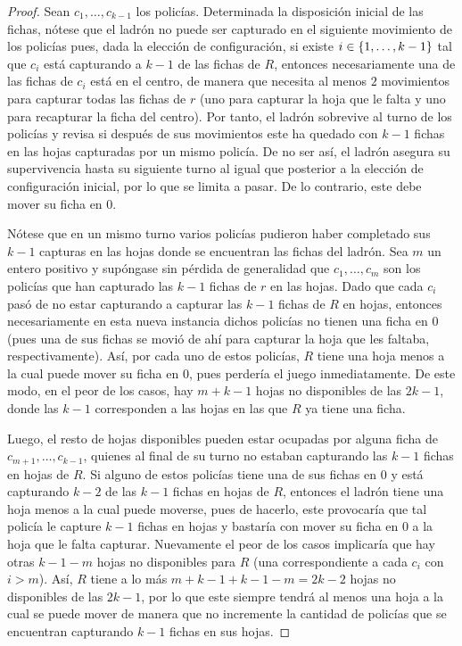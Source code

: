 \begin{proof}
    Sean $c_1,\dots, c_{k-1}$ los polic\'ias. Determinada la disposici\'on
    inicial de las fichas, n\'otese que el ladr\'on no puede ser capturado en el
    siguiente movimiento de los polic\'ias pues, dada la elecci\'on de
    configuraci\'on, si existe $i\in\{1,\dots, k-1\}$ tal que $c_i$ est\'a
    capturando a $k-1$ de las fichas de $R$, entonces necesariamente una de las
    fichas de $c_i$ est\'a en el centro, de manera que necesita al menos $2$
    movimientos para capturar todas las fichas de $r$ (uno para capturar la hoja
    que le falta y uno para recapturar la ficha del centro). Por tanto, el
    ladr\'on sobrevive al turno de los polic\'ias y revisa si despu\'es de sus
    movimientos este ha quedado con $k-1$ fichas en las hojas capturadas por un
    mismo polic\'ia. De no ser as\'i, el ladr\'on asegura su supervivencia hasta
    su siguiente turno al igual que posterior a la elecci\'on de configuraci\'on
    inicial, por lo que se limita a pasar. De lo contrario, este debe mover su
    ficha en $0$.
    
    N\'otese que en un mismo turno varios polic\'ias pudieron haber completado
    sus $k-1$ capturas en las hojas donde se encuentran las fichas del ladr\'on.
    Sea $m$ un entero positivo y sup\'ongase sin p\'erdida de generalidad que
    $c_{1},\dots, c_{m}$ son los polic\'ias que han capturado las $k-1$ fichas
    de $r$ en las hojas. Dado que cada $c_{i}$ pas\'o de no estar capturando a
    capturar las $k-1$ fichas de $R$ en hojas, entonces necesariamente en esta
    nueva instancia dichos polic\'ias no tienen una ficha en $0$ (pues una de
    sus fichas se movi\'o de ah\'i para capturar la hoja que les faltaba,
    respectivamente). As\'i, por cada uno de estos polic\'ias, $R$ tiene una
    hoja menos a la cual puede mover su ficha en $0$, pues perder\'ia el juego
    inmediatamente. De este modo, en el peor de los casos, hay $m+k-1$ hojas no
    disponibles de las $2k-1$, donde las $k-1$ corresponden a las hojas en las
    que $R$ ya tiene una ficha.

    Luego, el resto de hojas disponibles pueden estar ocupadas por alguna ficha
    de  $c_{{m+1}},\dots,c_{{k-1}}$, quienes al final de su turno no estaban
    capturando las $k-1$ fichas en hojas de $R$. Si alguno de estos polic\'ias
    tiene una de sus fichas en $0$ y est\'a capturando $k-2$ de las $k-1$ fichas
    en hojas de $R$, entonces el ladr\'on tiene una hoja menos a la cual puede
    moverse, pues de hacerlo, este provocar\'ia que tal polic\'ia le capture
    $k-1$ fichas en hojas y bastar\'ia con mover su ficha en $0$ a la hoja que
    le falta capturar. Nuevamente el peor de los casos implicar\'ia que hay
    otras $k-1-m$ hojas no disponibles para $R$ (una correspondiente a cada
    $c_i$ con $i>m$). As\'i, $R$ tiene a lo m\'as $m+k-1+k-1-m=2k-2$ hojas no
    disponibles de las $2k-1$, por lo que este siempre tendr\'a al menos una
    hoja a la cual se puede mover de manera que no incremente la cantidad de
    polic\'ias que se encuentran capturando $k-1$ fichas en sus hojas.


\end{proof}
